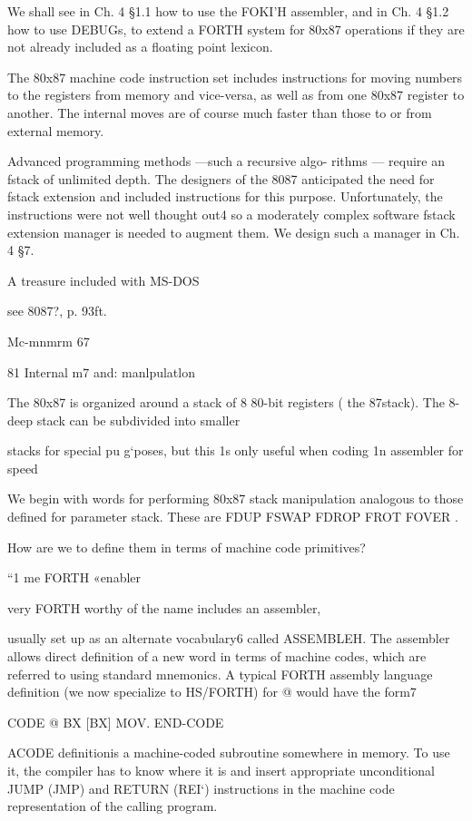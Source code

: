 We shall see in Ch. 4 §1.1 how to use the FOKI'H assembler, and
in Ch. 4 §1.2 how to use DEBUGs, to extend a FORTH system
for 80x87 operations if they are not already included as a ﬂoating
point lexicon.

The 80x87 machine code instruction set includes instructions for
moving numbers to the registers from memory and vice-versa, as
well as from one 80x87 register to another. The internal moves
are of course much faster than those to or from external memory.

Advanced programming methods —such a recursive algo-
rithms — require an fstack of unlimited depth. The designers of
the 8087 anticipated the need for fstack extension and included
instructions for this purpose. Unfortunately, the instructions were
not well thought out4 so a moderately complex software fstack
extension manager is needed to augment them. We design such a
manager in Ch. 4 §7.

 

A treasure included with MS-DOS

see 8087?, p. 93ft.

Mc-mnmrm 67

81 Internal m7 and: manlpulatlon

The 80x87 is organized around a stack of 8 80-bit registers ( the
87stack). The 8-deep stack can be subdivided into smaller

stacks for special pu g‘poses, but this 1s only useful when coding 1n
assembler for speed

We begin with words for performing 80x87 stack manipulation
analogous to those deﬁned for parameter stack. These are FDUP
FSWAP FDROP FROT FOVER .

How are we to deﬁne them in terms of machine code primitives?

“1 me FORTH «enabler

very FORTH worthy of the name includes an assembler,

usually set up as an alternate vocabulary6 called ASSEMBLEH.
The assembler allows direct deﬁnition of a new word in terms of
machine codes, which are referred to using standard mnemonics. A
typical FORTH assembly language deﬁnition (we now specialize to
HS/FORTH) for @ would have the form7

CODE @ BX [BX] MOV. END-CODE

ACODE deﬁnitionis a machine-coded subroutine somewhere
in memory. To use it, the compiler has to know where it is and
insert appropriate unconditional JUMP (JMP) and RETURN
(REI‘) instructions in the machine code representation of the
calling program.

